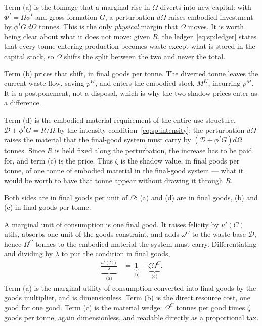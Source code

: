 Term (a) is the tonnage that a marginal rise in $\Omega$ diverts into new capital: with $\Phi^I=\Omega\phi^I$ and gross formation $G$, a perturbation $d\Omega$ raises embodied investment by $\phi^IG\,d\Omega$ tonnes. This is the only \emph{physical} margin that $\Omega$ moves. It is worth being clear about what it does not move: given $R$, the ledger~\eqref{eq:sp:ledger} states that every tonne entering production becomes waste except what is stored in the capital stock, so $\Omega$ shifts the split between the two and never the total.

Term (b) prices that shift, in final goods per tonne. The diverted tonne leaves the current waste flow, saving $p^W$, and enters the embodied stock $M^K$, incurring $p^M$. It is a postponement, not a disposal, which is why the two shadow prices enter as a difference.

Term (d) is the embodied-material requirement of the entire use structure, $\mathcal D+\phi^IG=R/\Omega$ by the intensity condition~\eqref{eq:sp:intensity}: the perturbation $d\Omega$ raises the material that the final-good system must carry by $\left(\mathcal D+\phi^IG\right)d\Omega$ tonnes. Since $R$ is held fixed along the perturbation, the increase has to be paid for, and term (c) is the price. Thus $\zeta$ is the shadow value, in final goods per tonne, of one tonne of embodied material in the final-good system --- what it would be worth to have that tonne appear without drawing it through $R$.

Both sides are in final goods per unit of $\Omega$: (a) and (d) are in final goods, (b) and (c) in final goods per tonne.

 A marginal unit of consumption is one final good. It raises felicity by $u'\left(C\right)$ utils, absorbs one unit of the goods constraint, and adds $\omega^C$ to the waste base $\mathcal D$, hence $\Omega^C$ tonnes to the embodied material the system must carry. Differentiating and dividing by $\lambda$ to put the condition in final goods,
\begin{align}
\underbrace{\frac{u'\left(C\right)}{\lambda}}_{\text{(a)}} &= \underbrace{1}_{\text{(b)}}+\underbrace{\zeta\Omega^C}_{\text{(c)}} .
\label{eq:sp:foc:C}
\end{align}
Term (a) is the marginal utility of consumption converted into final goods by the goods multiplier, and is dimensionless. Term (b) is the direct resource cost, one good for one good. Term (c) is the material wedge: $\Omega^C$ tonnes per good times $\zeta$ goods per tonne, again dimensionless, and readable directly as a proportional tax.

